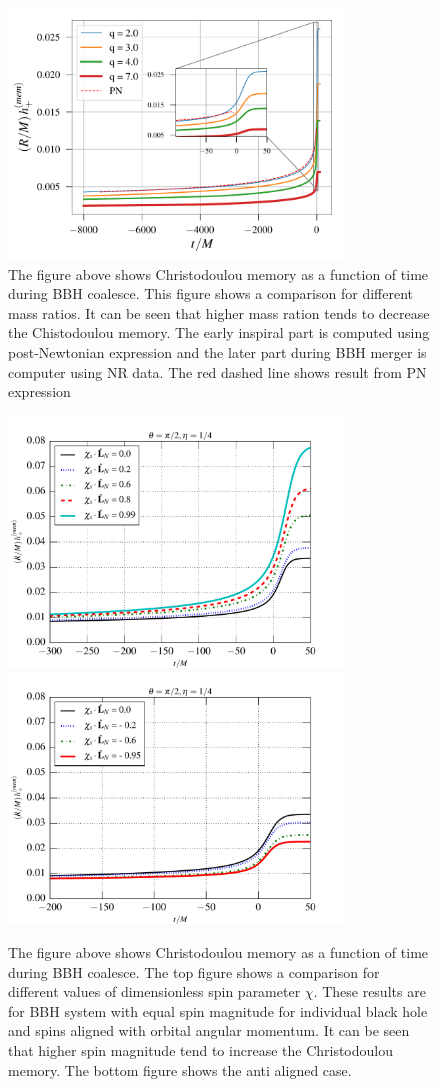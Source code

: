 \documentclass[twocolumn,showpacs,aps,prd,nobibnotes,floatfix]{revtex4-1}
\begin{document}
\begin{figure}
 	\includegraphics[width=3.5in]{../plots/MemoryPlot_nonSpining/q7.pdf}
 	\caption{The figure above shows Christodoulou memory as a function of time during BBH coalesce. This figure shows a comparison for different mass ratios. It can be seen that higher mass ration tends to decrease the Chistodoulou memory. The early inspiral part is computed using post-Newtonian expression and the later part during BBH merger is computer using NR data. The red dashed line shows result from PN expression}
 	\label{fig:differentmassratio}
\end{figure}
\begin{figure}
	\includegraphics[width=3.5in]{../plots/MemoryPlot_AlignedSpinSXSdata/0p99.pdf}
	\includegraphics[width=3.5in]{../plots/MemoryPlot_AntialignedSpinSXSdata/m0p94.pdf}
	\caption{The figure above shows Christodoulou memory as a function of time during BBH coalesce. The top figure shows a comparison for different values of dimensionless spin parameter $\chi$. These results are for BBH system with equal spin magnitude for individual black hole and spins aligned with orbital angular momentum. It can be seen that higher spin magnitude tend to increase the Christodoulou memory. The bottom figure shows the anti aligned case.  }
	\label{fig:differntchivalues}
\end{figure}
\end{document}
